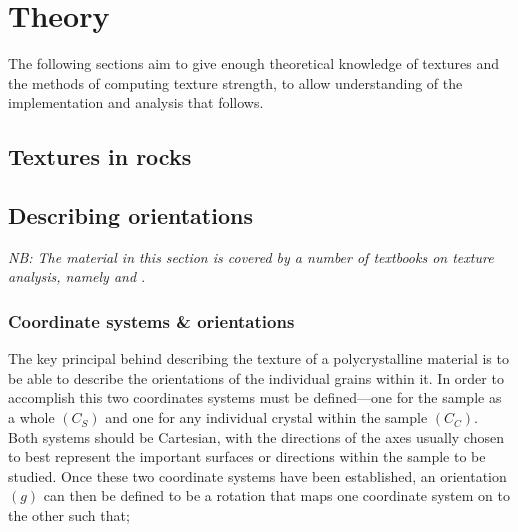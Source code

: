 \documentclass[a4paper,12pt]{report}
\numberwithin{equation}{chapter}
\begin{document}
\chapter{Theory} \label{chap:theory}
\vspace{-1cm}
The following sections aim to give enough theoretical knowledge of textures and the methods of computing texture strength, to allow understanding of the implementation and analysis that follows.


\section{Textures in rocks} 

\section{Describing orientations} \label{sec:orientations}
\emph{NB: The material in this section is covered by a number of textbooks on texture analysis, namely \cite{bunge1982texture} and \cite{Randle2000}}.




\subsection{Coordinate systems \& orientations} \label{subsec:coordinates}
The key principal behind describing the texture of a polycrystalline material is to be able to describe the orientations of the individual grains within it. In order to accomplish this two coordinates systems must be defined---one for the sample as a whole $(C_S)$ and one for any individual crystal within the sample $(C_C)$. Both systems should be Cartesian, with the directions of the axes usually chosen to best represent the important surfaces or directions within the sample to be studied. Once these two coordinate systems have been established, an orientation $(g)$ can then be defined to be a rotation that maps one coordinate system on to the other such that;
\end{document}
